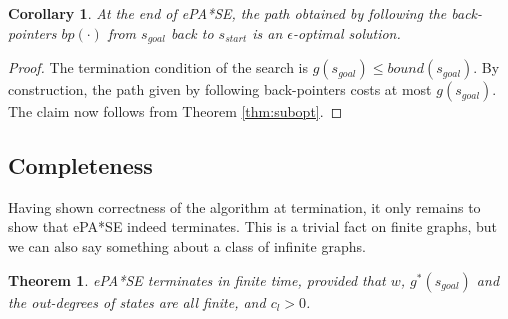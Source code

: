 \documentclass[letterpaper]{article}
\newtheorem{thm}{Theorem}
\newtheorem{cor}{Corollary}
\begin{document}
\begin{cor}
\label{cor:subopt}
At the end of ePA*SE, the path obtained by following the back-pointers $bp(\cdot)$ from $s_{goal}$ back to $s_{start}$ is an $\epsilon$-optimal solution.
\end{cor}

\begin{proof}
The termination condition of the search is $g(s_{goal}) \le bound(s_{goal})$. By construction, the path given by following back-pointers costs at most $g(s_{goal})$. The claim now follows from Theorem \ref{thm:subopt}.
\end{proof}

\subsection{Completeness}

Having shown correctness of the algorithm at termination, it only remains to show that ePA*SE indeed terminates. This is a trivial fact on finite graphs, but we can also say something about a class of infinite graphs.

\begin{thm}
\label{thm:complete}
ePA*SE terminates in finite time, provided that $w$, $g^*(s_{goal})$ and the out-degrees of states are all finite, and $c_l > 0$.
\end{thm}
\end{document}
